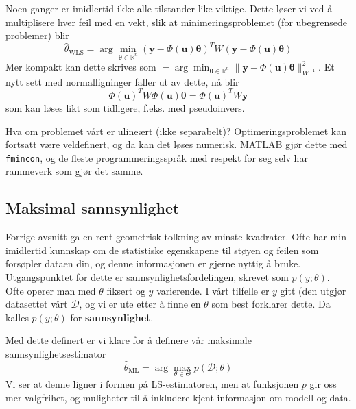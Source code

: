 \documentclass[12pt]{article}
\begin{document}
Noen ganger er imidlertid ikke alle tilstander like viktige. Dette løser vi ved å multiplisere hver feil med en vekt, slik at minimeringsproblemet (for ubegrensede problemer) blir
\begin{equation}
\widehat{\theta}_{\mathrm{WLS}}=\arg \min _{\boldsymbol{\theta} \in \mathbb{R}^{n}}(\boldsymbol{y}-\Phi(\boldsymbol{u}) \boldsymbol{\theta})^{T} W(\boldsymbol{y}-\Phi(\boldsymbol{u}) \boldsymbol{\theta})
\end{equation}
Mer kompakt kan dette skrives som $
=\arg \min _{\boldsymbol{\theta} \in \mathbb{R}^{n}}\|\boldsymbol{y}-\Phi(\boldsymbol{u}) \boldsymbol{\theta}\|_{W^{-1}}^{2}
$. Et nytt sett med normalligninger faller ut av dette, nå blir 
\begin{equation}
\Phi(\boldsymbol{u})^{T} W \Phi(\boldsymbol{u}) \boldsymbol{\theta}=\Phi(\boldsymbol{u})^{T} W \boldsymbol{y}
\end{equation}
som kan løses likt som tidligere, f.eks. med pseudoinvers.

Hva om problemet vårt er ulineært (ikke separabelt)? Optimeringsproblemet kan fortsatt være veldefinert, og da kan det løses numerisk. MATLAB gjør dette med \texttt{fmincon}, og de fleste programmeringsspråk med respekt for seg selv har rammeverk som gjør det samme.

\subsection{Maksimal sannsynlighet}
Forrige avsnitt ga en rent geometrisk tolkning av minste kvadrater. Ofte har min imidlertid kunnskap om de statistiske egenskapene til støyen og feilen som forsøpler dataen din, og denne informasjonen er gjerne nyttig å bruke. Utgangspunktet for dette er sannsynlighetsfordelingen, skrevet som $p(y ; \theta)$. Ofte operer man med $\theta$ fiksert og $y$ varierende. I vårt tilfelle er $y$ gitt (den utgjør datasettet vårt $\mathcal{D}$, og vi er ute etter å finne en $\theta$ som best forklarer dette. Da kalles $p(y ; \theta)$ for \textbf{sannsynlighet}.

Med dette definert er vi klare for å definere vår maksimale sannsynlighetsestimator
\begin{equation}
\widehat{\theta}_{\mathrm{ML}}=\arg \max _{\theta \in \Theta} p(\mathcal{D} ; \theta)
\end{equation}
Vi ser at denne ligner i formen på LS-estimatoren, men at funksjonen $p$ gir oss mer valgfrihet, og muligheter til å inkludere kjent informasjon om modell og data.
\end{document}
